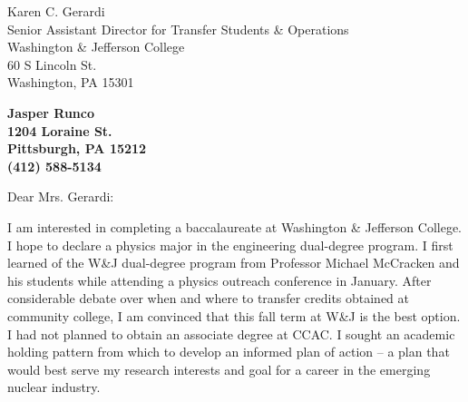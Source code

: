 \documentclass[11pt]{letter} %
\begin{document}
\begin{letter}{Karen C. Gerardi\\
Senior Assistant Director for Transfer Students \& Operations \\
Washington \& Jefferson College\\
60 S Lincoln St.\\
Washington, PA 15301}


\begin{center}
\large\bf Jasper Runco \\ %
1204 Loraine St. \\ Pittsburgh, PA 15212 \\ (412) 588-5134 %
\end{center}

\signature{Jasper Runco} %


\opening{Dear Mrs. Gerardi:}

I am interested in completing a baccalaureate at Washington \& Jefferson College. I hope to declare a physics major in the engineering dual-degree program. I first learned of the W\&J dual-degree program from Professor Michael McCracken and his students while attending a physics outreach conference in January. After considerable debate over when and where to transfer credits obtained at community college, I am convinced that this fall term at W\&J is the best option. I had not planned to obtain an associate degree at CCAC. I sought an academic holding pattern from which to develop an informed plan of action -- a plan that would best serve my research interests and goal for a career in the emerging nuclear industry.


\end{letter}
\end{document}
